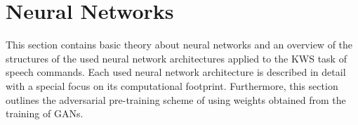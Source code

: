 
\chapter{Neural Networks}\label{sec:nn}
This section contains basic theory about neural networks and an overview of the structures of the used neural network architectures applied to the KWS task of speech commands.
Each used neural network architecture is described in detail with a special focus on its computational footprint.
Furthermore, this section outlines the adversarial pre-training scheme of using weights obtained from the training of GANs.





